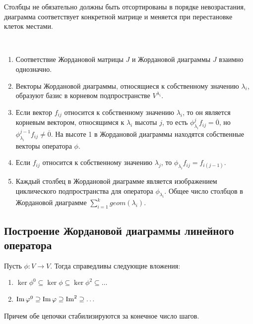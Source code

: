 \begin{note}
    Столбцы не обязательно должны быть отсортированы в порядке невозрастания, диаграмма соответствует 
    конкретной матрице и меняется при перестановке клеток местами.
\end{note}

\begin{proposition}~
    \begin{enumerate}
        \item Соответствие Жордановой матрицы $J$ и Жордановой диаграммы $J$ взаимно однозначно.
        \item Векторы Жордановой диаграммы, относящиеся к собственному значению $\lambda_i$, образуют базис 
        в корневом подпространстве $V^{\lambda_i}$.
        \item Если вектор $f_{ij}$ относится к собственному значению $\lambda_i$, 
        то он является корневым вектором, относящимся к $\lambda_i$ высоты $j$, 
        то есть $\phi_{\lambda_i}^j f_{ij} = \overline{0}$, но $\phi_{\lambda_i}^{j-1} f_{ij} \neq \overline{0}$.
        На высоте 1 в Жордановой диаграммы находятся собственные векторы оператора $\phi$.
        \item Если $f_{ij}$ относится к собственному значению $\lambda_{j}$, то $\phi_{\lambda_i} f_{ij} = f_{i(j-1)}$.
        \item Каждый столбец в Жордановой диаграмме является изображением циклического подпространства для оператора $\phi_{\lambda_i}$. Общее число столбцов в Жордановой диаграмме $\displaystyle\sum_{i=1}^{k} geom(\lambda_i)$.
    \end{enumerate}
\end{proposition}

\subsection{Построение Жордановой диаграммы линейного оператора}

\begin{proposition}
    Пусть $\phi : V \to V$. Тогда справедливы следующие вложения:
    \begin{enumerate}
        \item $\ker \phi^0 \subseteq \ker \phi \subseteq \ker \phi^2 \subseteq \dots$
        \item $\operatorname{Im} \varphi^0 \supseteq \operatorname{Im} \varphi \supseteq \operatorname{Im}^2 \supseteq \dots$
    \end{enumerate}
    Причем обе цепочки стабилизируются за конечное число шагов.
\end{proposition}

